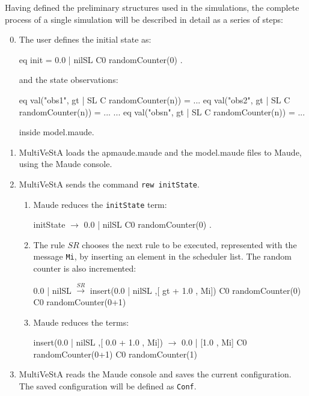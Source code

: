 Having defined the preliminary structures used in the simulations, the complete process of a single simulation will be described in detail as a series of steps:
\begin{enumerate}
    \setcounter{enumi}{-1}
    \item The user defines the initial state as:
    \begin{maude}
    
eq init = {0.0 | nilSL} C0 randomCounter(0) . \end{maude}
    and the state observations:
    \begin{maude}
    
eq val("obs1", {gt | SL} {C randomCounter(n)}) = ...
eq val("obs2", {gt | SL} {C randomCounter(n)}) = ...
...
eq val("obsn", {gt | SL} {C randomCounter(n)}) = ...\end{maude}
    inside model.maude.
    \item MultiVeStA loads the apmaude.maude and the model.maude files to Maude, using the Maude console.
    \item MultiVeStA sends the command \texttt{rew initState}. 
    \begin{enumerate}
        \item Maude reduces the \texttt{initState} term:
        \begin{maude}

initState $\rightarrow$ {0.0 | nilSL} {C0  randomCounter(0)} .\end{maude}
        \item The rule $SR$ chooses the next rule to be executed, represented with the message \texttt{Mi}, by inserting an element in the scheduler list. The random counter is also incremented:
        \begin{maude}

{0.0 | nilSL }        $\xrightarrow{SR}$   insert({0.0 | nilSL },[ gt + 1.0 , Mi])
{C0 randomCounter(0)}       {C0 randomCounter(0+1)}\end{maude}
        \item Maude reduces the terms:
        \begin{maude}
        
insert({0.0 | nilSL },[ 0.0 + 1.0 , Mi]) $\rightarrow$ {0.0 | [1.0 , Mi] } 
{C0 randomCounter(0+1)}                     {C0 randomCounter(1)}\end{maude}
    \end{enumerate}

\item MultiVeStA reads the Maude console and saves the current configuration. The saved configuration will be defined as \texttt{Conf}.


\end{enumerate}
